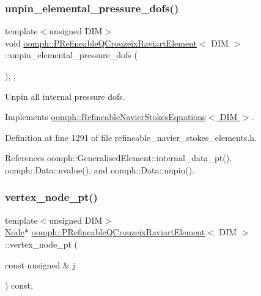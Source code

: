 \subsubsection{\texorpdfstring{unpin\+\_\+elemental\+\_\+pressure\+\_\+dofs()}{unpin\_elemental\_pressure\_dofs()}}
{\footnotesize\ttfamily template$<$unsigned D\+IM$>$ \\
void \hyperlink{classoomph_1_1PRefineableQCrouzeixRaviartElement}{oomph\+::\+P\+Refineable\+Q\+Crouzeix\+Raviart\+Element}$<$ D\+IM $>$\+::unpin\+\_\+elemental\+\_\+pressure\+\_\+dofs (\begin{DoxyParamCaption}{ }\end{DoxyParamCaption})\hspace{0.3cm}{\ttfamily [inline]}, {\ttfamily [private]}, {\ttfamily [virtual]}}



Unpin all internal pressure dofs. 



Implements \hyperlink{classoomph_1_1RefineableNavierStokesEquations_acd0b56b66d250625401a9f6578f8bebc}{oomph\+::\+Refineable\+Navier\+Stokes\+Equations$<$ D\+I\+M $>$}.



Definition at line 1291 of file refineable\+\_\+navier\+\_\+stokes\+\_\+elements.\+h.



References oomph\+::\+Generalised\+Element\+::internal\+\_\+data\+\_\+pt(), oomph\+::\+Data\+::nvalue(), and oomph\+::\+Data\+::unpin().

\mbox{\label{classoomph_1_1PRefineableQCrouzeixRaviartElement_a0a0d25592c0b9b04505fbd0b3bb4fb22}} 
\subsubsection{\texorpdfstring{vertex\+\_\+node\+\_\+pt()}{vertex\_node\_pt()}}
{\footnotesize\ttfamily template$<$unsigned D\+IM$>$ \\
\hyperlink{classoomph_1_1Node}{Node}$\ast$ \hyperlink{classoomph_1_1PRefineableQCrouzeixRaviartElement}{oomph\+::\+P\+Refineable\+Q\+Crouzeix\+Raviart\+Element}$<$ D\+IM $>$\+::vertex\+\_\+node\+\_\+pt (\begin{DoxyParamCaption}\item[{const unsigned \&}]{j }\end{DoxyParamCaption}) const\hspace{0.3cm}{\ttfamily [inline]}, {\ttfamily [virtual]}}



